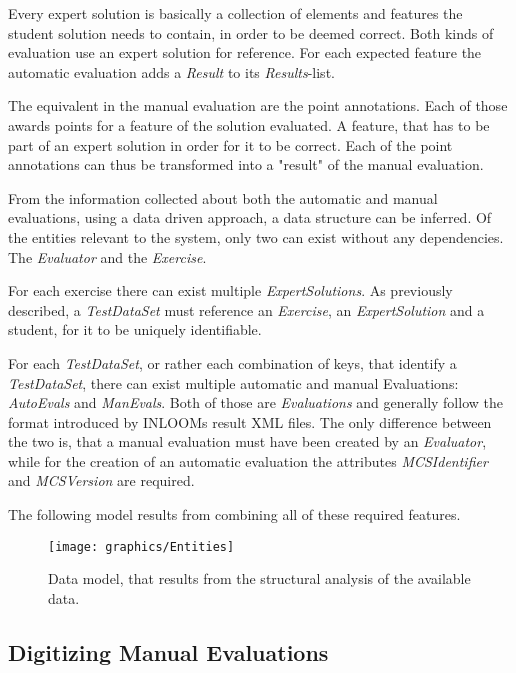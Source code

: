 Every expert solution is basically a collection of elements and features the student solution 
needs to contain, in order to be deemed correct. Both kinds of evaluation use an expert solution
for reference. For each expected feature the automatic evaluation adds a \textit{Result} to its
\textit{Results}-list. 

The equivalent in the manual evaluation are the point annotations. Each of those awards points
for a feature of the solution evaluated. A feature, that has to be part of an expert solution in
order for it to be correct. Each of the point annotations can thus be transformed into a "result"
of the manual evaluation. 

From the information collected about both the automatic and manual evaluations, using a data 
driven approach, a data structure can be inferred. Of the entities relevant to the system,
only two can exist without any dependencies. The \textit{Evaluator} and the \textit{Exercise}. 

For each exercise there can exist multiple \textit{ExpertSolutions}. As previously described, a
\textit{TestDataSet} must reference an \textit{Exercise}, an \textit{ExpertSolution} and a 
student, for it to be uniquely identifiable. 

For each \textit{TestDataSet}, or rather each combination of keys, that identify a 
\textit{TestDataSet}, there can exist multiple automatic and manual Evaluations: 
\textit{AutoEvals} and \textit{ManEvals}. Both of those are \textit{Evaluations} and generally
follow the format introduced by INLOOMs result XML files. The only difference between the two is,
that a manual evaluation must have been created by an \textit{Evaluator}, while for the creation
of an automatic evaluation the attributes \textit{MCSIdentifier} and \textit{MCSVersion} are 
required.

The following model results from combining all of these required features.

\begin{figure}
    \caption{Data model, that results from the structural analysis of the available data.}
    \texttt{[image: graphics/Entities]}
\end{figure}
\pagebreak



\subsection{Digitizing Manual Evaluations}
\label{DigitizingManualEvaluations}

